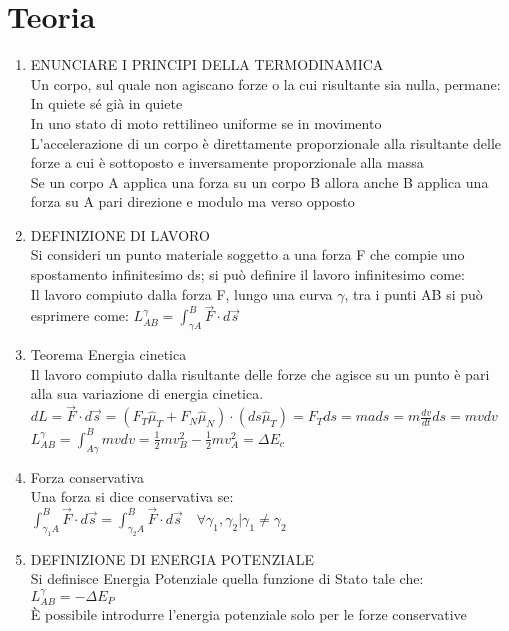 \documentclass[8pt]{scrreprt}
\begin{document}
\chapter*{Teoria}
\begin{multicols*}{2}
\begin{enumerate} 
\item	ENUNCIARE I PRINCIPI DELLA TERMODINAMICA\\
Un corpo, sul quale non agiscano forze o la cui risultante sia nulla, permane: \\
In quiete sé già in quiete \\
In uno stato di moto rettilineo uniforme se in movimento\\
L’accelerazione di un corpo è direttamente proporzionale alla risultante delle forze a cui è sottoposto e inversamente proporzionale alla massa \\
Se un corpo A applica una forza su un corpo B allora anche B applica una forza su A pari direzione e modulo ma verso opposto

\item	DEFINIZIONE DI LAVORO\\
Si consideri un punto materiale soggetto a una forza F che compie uno spostamento infinitesimo ds; si può definire il lavoro infinitesimo come: {}\\
Il lavoro compiuto dalla forza F, lungo una curva $\gamma$, tra i punti AB si può esprimere come: $L_{AB}^\gamma = \int_{\gamma A}^{B} \vec{F} \cdot d\vec{s}$


\item Teorema Energia cinetica\\
Il lavoro compiuto dalla risultante delle forze che agisce su un punto è pari alla sua variazione di energia cinetica.\\	
$dL = \vec{F} \cdot d\vec{s} = (F_T \hat{\mu}_T+ F_N \hat{\mu}_N) \cdot (ds\hat{\mu}_T) = F_T ds = mads = m \frac{dv}{dt}ds = mvdv$\\
$L^\gamma_{AB} = \int_{A\gamma}^{B} mvdv = \frac{1}{2}mv^2_B - \frac{1}{2}mv^2_A = \Delta E_c$

\item Forza conservativa\\
Una forza si dice conservativa se:\\
$\int_{\gamma_1A}^{B} \vec{F} \cdot d\vec{s} = \int_{\gamma_2A}^{B} \vec{F} \cdot d\vec{s} \quad \forall \gamma_1, \gamma_2 | \gamma_1 \neq  \gamma_2$

\item DEFINIZIONE DI ENERGIA POTENZIALE\\
Si definisce Energia Potenziale quella funzione di Stato tale che: $L_{AB}^\gamma = -\Delta E_P$\\
È possibile introdurre l’energia potenziale solo per le forze conservative


\end{enumerate}
\end{multicols*}
\end{document}
